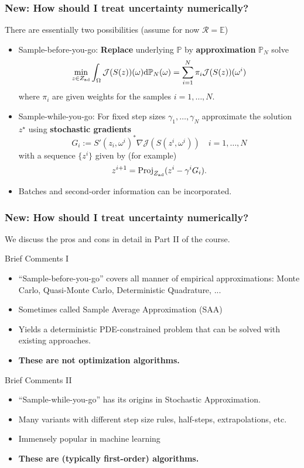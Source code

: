 \documentclass[aspectratio=169,xcolor=dvipsnames,10pt]{beamer}
\newcommand{\risk}{\mathcal{R}}
\begin{document}
\begin{frame}\frametitle{New: How should I treat uncertainty numerically?}
\begin{block}{}
There are essentially two possibilities (assume for now $\risk = \mathbb E$)
\begin{itemize}
\item Sample-before-you-go: \textbf{Replace} underlying $\mathbb P$ by  \textbf{approximation} $\mathbb P_N$ solve
\[
\min_{z \in Z_{\rm ad}} \int_{\Omega}\mathcal{J}(S(z))(\omega) \mathrm{d} \mathbb P_{N}(\omega) = \sum_{i=1}^{N} \pi_i \mathcal{J}(S(z))(\omega^i)
\]
where $\pi_i$ are given weights for the samples $i = 1,\dots,  N$.\pause
\item Sample-while-you-go: For fixed step sizes $\gamma_1,\dots,\gamma_N$ approximate the solution $z^{\star}$ using \textbf{stochastic gradients}
\[
G_i :=  S'(z_i,\omega^i)^* \nabla \mathcal{J}(S(z^i,\omega^i)) \quad i=1,\dots,N
\]
with a sequence $\{z^i\}$ given by (for example)
\[
z^{i+1} = \mathrm{Proj}_{Z_{\rm ad}}(z^i - \gamma^i G_i).
\]
\item Batches and second-order information can be incorporated. 
\end{itemize}
\end{block}
\end{frame}

\begin{frame}\frametitle{New: How should I treat uncertainty numerically?}
\begin{block}{}
\centering
We discuss the pros and cons in detail in Part II of the course.
\end{block}
\begin{block}{Brief Comments I}
\begin{itemize}
\item ``Sample-before-you-go'' covers all manner of empirical approximations: Monte Carlo, Quasi-Monte Carlo, Deterministic Quadrature, ... 
\item Sometimes called Sample Average Approximation (SAA)
\item Yields a deterministic PDE-constrained problem that can be solved with existing approaches.
\item \textbf{These are not optimization algorithms.}
\end{itemize}
\end{block}

\begin{block}{Brief Comments II}
\begin{itemize}
\item ``Sample-while-you-go'' has its origins in Stochastic Approximation. 
\item Many variants with different step size rules, half-steps, extrapolations, etc.
\item Immensely popular in machine learning
\item \textbf{These are (typically first-order) algorithms.}
\end{itemize}
\end{block}
\end{frame}
\end{document}
